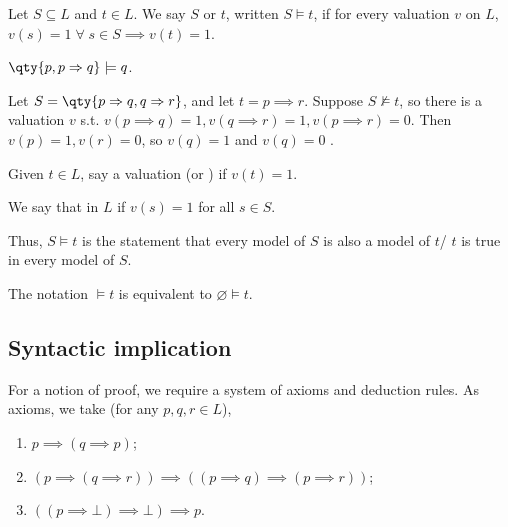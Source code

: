 \begin{definition}
    Let $S \subseteq L$ and $t \in L$.
    We say $S$  or  $t$, written $S \models t$, if for every valuation $v$ on $L$, $v(s) = 1 \; \forall \; s \in S \implies v(t) = 1$.
\end{definition}

\begin{example}
    $\qty{p, p \implies q} \models q$.
\end{example}

\begin{example}
    Let $S = \qty{p \implies q, q \implies r}$, and let $t = p \implies r$.
    Suppose $S \not\models t$, so there is a valuation $v$ s.t. $v(p \implies q) = 1, v(q \implies r) = 1, v(p \implies r) = 0$.
    Then $v(p) = 1, v(r) = 0$, so $v(q) = 1$ and $v(q) = 0$ \Lightning.
\end{example}

\begin{definition}[Model]
    Given $t \in L$, say a valuation  (or ) if $v(t) = 1$.
\end{definition}

\begin{definition}[Model]
    We say that  in $L$ if $v(s) = 1$ for all $s \in S$.
\end{definition}

Thus, $S \models t$ is the statement that every model of $S$ is also a model of $t$/ $t$ is true in every model of $S$.

\begin{remark}
    The notation $\models t$ is equivalent to $\varnothing \models t$.
\end{remark}

\subsection{Syntactic implication}
For a notion of proof, we require a system of axioms and deduction rules.
As axioms, we take (for any $p, q, r \in L$),
\begin{enumerate}
    \item $p \implies (q \implies p)$;
    \item $(p \implies (q \implies r)) \implies ((p \implies q) \implies (p \implies r))$;
    \item $((p \implies \bot) \implies \bot) \implies p$.
\end{enumerate}

